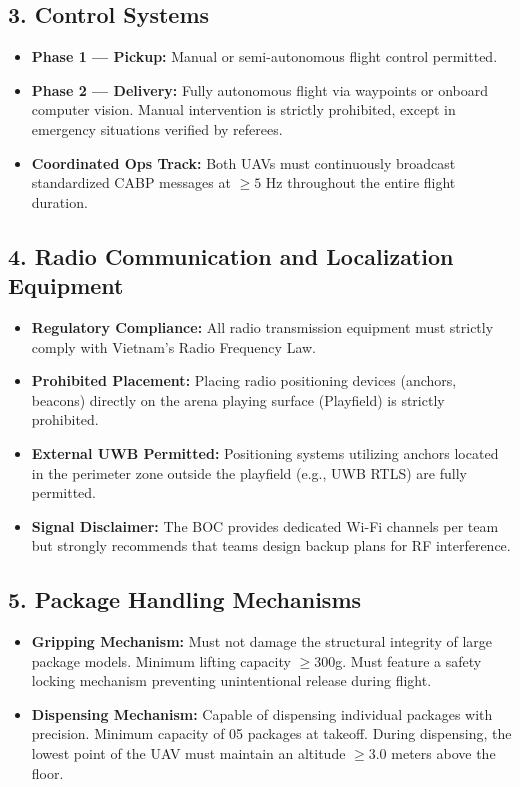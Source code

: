 \documentclass[12pt,a4paper]{article}
\begin{document}
\subsection*{3. Control Systems}
\begin{itemize}
\item \textbf{Phase 1 — Pickup:} Manual or semi-autonomous flight control permitted.
\item \textbf{Phase 2 — Delivery:} Fully autonomous flight via waypoints or onboard computer vision. Manual intervention is strictly prohibited, except in emergency situations verified by referees.
\item \textbf{Coordinated Ops Track:} Both UAVs must continuously broadcast standardized CABP messages at $\geq 5\text{ Hz}$ throughout the entire flight duration.
\end{itemize}

\subsection*{4. Radio Communication and Localization Equipment}
\begin{itemize}
\item \textbf{Regulatory Compliance:} All radio transmission equipment must strictly comply with Vietnam's Radio Frequency Law.
\item \textbf{Prohibited Placement:} Placing radio positioning devices (anchors, beacons) directly on the arena playing surface (Playfield) is strictly prohibited.
\item \textbf{External UWB Permitted:} Positioning systems utilizing anchors located in the perimeter zone outside the playfield (e.g., UWB RTLS) are fully permitted.
\item \textbf{Signal Disclaimer:} The BOC provides dedicated Wi-Fi channels per team but strongly recommends that teams design backup plans for RF interference.
\end{itemize}

\subsection*{5. Package Handling Mechanisms}
\begin{itemize}
\item \textbf{Gripping Mechanism:} Must not damage the structural integrity of large package models. Minimum lifting capacity $\geq 300$g. Must feature a safety locking mechanism preventing unintentional release during flight.
\item \textbf{Dispensing Mechanism:} Capable of dispensing individual packages with precision. Minimum capacity of 05 packages at takeoff. During dispensing, the lowest point of the UAV must maintain an altitude $\geq 3.0$ meters above the floor.
\end{itemize}
\end{document}
